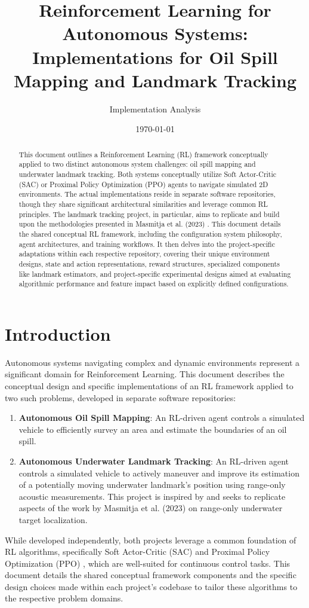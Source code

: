 \documentclass[11pt,a4paper]{article}
\title{Reinforcement Learning for Autonomous Systems: \\ Implementations for Oil Spill Mapping and Landmark Tracking} %
\author{Implementation Analysis}
\date{\today}
\begin{document}
\maketitle
\begin{abstract}
This document outlines a Reinforcement Learning (RL) framework conceptually applied to two distinct autonomous system challenges: oil spill mapping and underwater landmark tracking. Both systems conceptually utilize Soft Actor-Critic (SAC) or Proximal Policy Optimization (PPO) agents to navigate simulated 2D environments. The actual implementations reside in separate software repositories, though they share significant architectural similarities and leverage common RL principles. The landmark tracking project, in particular, aims to replicate and build upon the methodologies presented in Masmitja et al. (2023) \cite{masmitja2023tracking}. This document details the shared conceptual RL framework, including the configuration system philosophy, agent architectures, and training workflows. It then delves into the project-specific adaptations within each respective repository, covering their unique environment designs, state and action representations, reward structures, specialized components like landmark estimators, and project-specific experimental designs aimed at evaluating algorithmic performance and feature impact based on explicitly defined configurations.
\end{abstract}

\section{Introduction}
Autonomous systems navigating complex and dynamic environments represent a significant domain for Reinforcement Learning. This document describes the conceptual design and specific implementations of an RL framework applied to two such problems, developed in separate software repositories:
\begin{enumerate}
    \item \textbf{Autonomous Oil Spill Mapping}: An RL-driven agent controls a simulated vehicle to efficiently survey an area and estimate the boundaries of an oil spill.
    \item \textbf{Autonomous Underwater Landmark Tracking}: An RL-driven agent controls a simulated vehicle to actively maneuver and improve its estimation of a potentially moving underwater landmark's position using range-only acoustic measurements. This project is inspired by and seeks to replicate aspects of the work by Masmitja et al. (2023) \cite{masmitja2023tracking} on range-only underwater target localization.
\end{enumerate}
While developed independently, both projects leverage a common foundation of RL algorithms, specifically Soft Actor-Critic (SAC) \cite{sac_paper} and Proximal Policy Optimization (PPO) \cite{ppo_paper}, which are well-suited for continuous control tasks. This document details the shared conceptual framework components and the specific design choices made within each project's codebase to tailor these algorithms to the respective problem domains.
\end{document}
